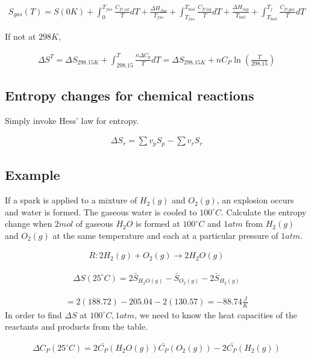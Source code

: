 \documentclass[12pt]{book}
\begin{document}
\begin{align*}
    S_{gas}(T)=S(0K)+\int_{0}^{T_{fus}}\frac{C_{P,sol}}{T} dT+\frac{\Delta H_{fus}}{T_{fus}}+\int_{T_{fus}}^{T_{boil}}\frac{C_{P,liq}}{T} dT+\frac{\Delta H_{vap}}{T_{boil}}+\int_{T_{boil}}^{T_{f}}\frac{C_{P,gas}}{T}dT
\end{align*}

If not at $298K$,

\begin{align*}
    \Delta S^T=\Delta S_{298.15K}+\int_{298.15}^{T}\frac{n\Delta C_p}{T}dT=\Delta S_{298.15K}+nC_P\ln\left(\frac{T}{298.15}\right)
\end{align*}

\subsection*{Entropy changes for chemical reactions}

Simply invoke Hess' law for entropy.

\begin{align*}
    \Delta S_r=\sum v_p S_{p}-\sum v_r S_r
\end{align*}

\subsection*{Example}

If a spark is applied to a mixture of $H_2(g)$ and $O_2(g)$, an explosion occurs and
water is formed. The gaseous water is cooled to $100^{\circ}C$. Calculate the entropy
change when $2 mol$ of gaseous $H_2O$ is formed at $100^{\circ}C$ and $1 atm$ from $H_2(g)$
and $O_2(g)$ at the same temperature and each at a particular pressure of $1 atm$.

\begin{align*}
    R:2H_2(g)+O_2(g)\rightarrow2H_2O(g)
\end{align*}

\begin{align*}
    \Delta S(25^{\circ}C)=2\bar{S}_{H_2O(g)}-\bar{S}_{O_2(g)}-2\bar{S}_{H_2(g)}
\end{align*}

\begin{align*}
    =2(188.72)-205.04-2(130.57)=-88.74\frac{J}{K}
\end{align*}
In order to find $\Delta S$ at $100^{\circ}C, 1atm$, we need to know the heat capacities of the reactants and products from the table.

\begin{align*}
    \Delta C_P(25^{\circ}C)=2\bar{C_P}(H_2O(g))\bar{C_P}(O_2(g))-2\bar{C_P}(H_2(g))
\end{align*}
\end{document}
